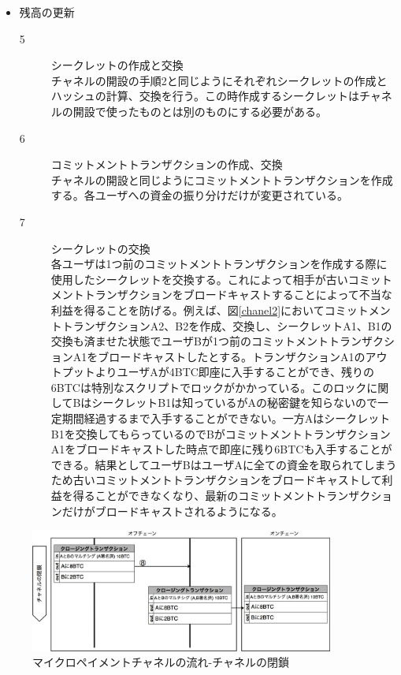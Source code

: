 \documentclass[12pt]{jarticle}
\begin{document}
\begin{itemize}
\item 残高の更新\\
\begin{description}
\item[5] シークレットの作成と交換\\
チャネルの開設の手順2と同じようにそれぞれシークレットの作成とハッシュの計算、交換を行う。この時作成するシークレットはチャネルの開設で使ったものとは別のものにする必要がある。

\item[6] コミットメントトランザクションの作成、交換\\
チャネルの開設と同じようにコミットメントトランザクションを作成する。各ユーザへの資金の振り分けだけが変更されている。
\item[7] シークレットの交換\\
各ユーザは1つ前のコミットメントトランザクションを作成する際に使用したシークレットを交換する。これによって相手が古いコミットメントトランザクションをブロードキャストすることによって不当な利益を得ることを防げる。例えば、図\ref{chanel2}においてコミットメントトランザクションA2、B2を作成、交換し、シークレットA1、B1の交換も済ませた状態でユーザBが1つ前のコミットメントトランザクションA1をブロードキャストしたとする。トランザクションA1のアウトプットよりユーザAが4BTC即座に入手することができ、残りの6BTCは特別なスクリプトでロックがかかっている。このロックに関してBはシークレットB1は知っているがAの秘密鍵を知らないので一定期間経過するまで入手することができない。一方AはシークレットB1を交換してもらっているのでBがコミットメントトランザクションA1をブロードキャストした時点で即座に残り6BTCも入手することができる。結果としてユーザBはユーザAに全ての資金を取られてしまうため古いコミットメントトランザクションをブロードキャストして利益を得ることができなくなり、最新のコミットメントトランザクションだけがブロードキャストされるようになる。
\end{description}
\end{itemize}

\begin{figure}[h]
 \centering
   \includegraphics[width=100mm]{figures/maicrochanelpart3.jpg}
 \caption{マイクロペイメントチャネルの流れ-チャネルの閉鎖}
 \label{chanel3}
\end{figure}
\end{document}
